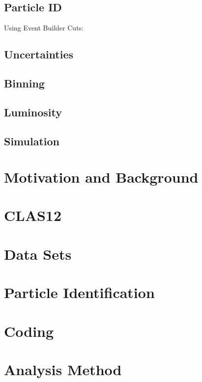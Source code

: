 \documentclass[oneside]{book}
\begin{document}
\section{Particle ID}
Using Event Builder Cuts:
\section{Uncertainties}
\section{Binning}
\section{Luminosity}
\section{Simulation}



\chapter{Motivation and Background}
    
    
\chapter{CLAS12}
    
    
\chapter{Data Sets}
    
    
\chapter{Particle Identification}
    
    
\chapter{Coding}
    


\chapter{Analysis Method}
    
\end{document}

